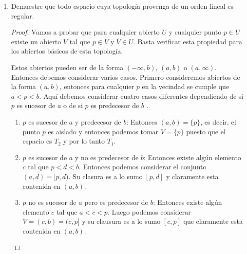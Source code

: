 \documentclass[paper=letter, fontsize=11pt]{scrartcl} %
\numberwithin{equation}{section} %
\numberwithin{figure}{section} %
\numberwithin{table}{section} %
\begin{document}
\begin{enumerate}
\begin{enumerate}
\begin{proof}
Entonces tome como función continua la función identidad $ i:(X,\tau') \to (X, \tau) $ tal que $ i(x)=x $.
Claramente la función es sobreyectiva. Además es continua porque la preimagen de cualquier abierto $ U \in \tau $ es $ i^{-1}(U)= U $ que es abierto en $ \tau' $ porque cualquier subconjunto es abierto en la topología discreta.

En particular si tomamos por ejemplo el espacio de Sierpinsky que ni siquiera es $ T_2 $ vemos que es la imagen continua del espacio discreto de 3 elementos que es métrico y por lo tanto $ T_4 $, por lo tanto la hipótesis de que la función sea cerrada es necesaria. 
\end{proof}
\end{enumerate}

\item Demuestre que todo espacio cuya topología provenga de un orden lineal es regular.
\begin{proof}
Vamos a probar que para cualquier abierto $ U $ y cualquier punto $ p \in U $ existe un abierto $ V $ tal que $ p \in V $ y $ \overline{V} \in U $. Basta verificar esta propiedad para los abiertos básicos de esta topología.

Estos abiertos pueden ser de la forma $ (-\infty,b) $, $ (a,b) $ o $ (a,\infty) $. Entonces debemos considerar varios casos. Primero consideremos abiertos de la forma $ (a,b) $, entonces para cualquier $ p $ en la vecindad se cumple que $ a < p < b $. Aquí debemos considerar cuatro casos diferentes dependiendo de si $ p $ es sucesor de $ a $ o de si $ p $ es predecesor de $b$ .

\begin{enumerate}
\item $ p $ es sucesor de $ a $ y predecesor de $ b $: Entonces $ (a,b) = \{p\} $, es decir, el punto $ p $ es aislado y entonces podemos tomar $ V = \{p\} $ puesto que el espacio es $ T_2 $ y por lo tanto $ T_1 $.
\item $ p $ es sucesor de $ a $ y no es predecesor de $ b $: Entonces existe algún elemento $ c $ tal que $ p<d<b $. Entonces podemos considerar el conjunto $ (a,d)=[p,d) $. Su clasura es a lo sumo $ [p,d] $ y claramente esta contenida en $(a,b)$.

\item $ p $ no es sucesor de $ a $ pero es predecesor de $ b $: Entonces existe algún elemento $ c $ tal que $ a < c < p $. Luego podemos considerar $ V = (c,b)=(c,p] $ y su clausura es a lo sumo $ [c,p] $ que claramente esta contenida en $ (a,b) $.


\end{enumerate}
\end{proof}
\end{enumerate}
\end{document}
